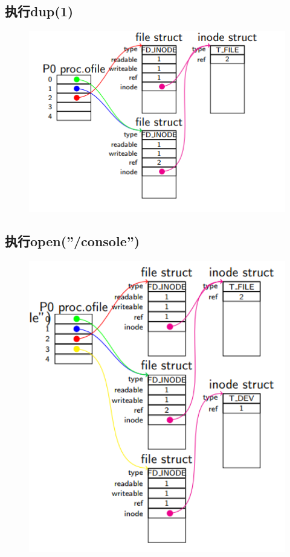 \documentclass[a4paper,12pt]{report}
\begin{document}
\subsection{ 	执行dup(1)}
\begin{figure}[H]
	\centering
	\includegraphics [width=1.0\textwidth]{figure//image161.png}
\end{figure}
\subsection{ 	执行open(”/console”)}
\begin{figure}[H]
	\centering
	\includegraphics [width=1.0\textwidth]{figure//image162.png}
\end{figure}
\end{document}
